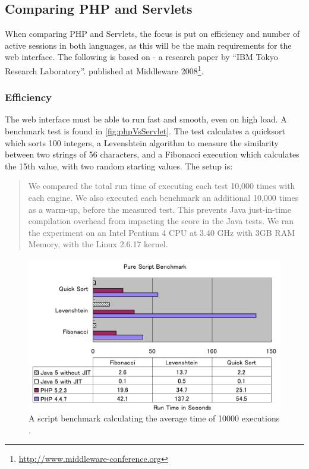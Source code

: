 \subsection*{Comparing PHP and Servlets}
When comparing PHP and Servlets, the focus is put on efficiency and number of active sessions in both languages, as this will be the main requirements for the web interface. The following is based on \cite{servletVsPHP} - a research paper by ``IBM Tokyo Research Laboratory''. published at Middleware 2008\footnote{\url{http://www.middleware-conference.org}}.

\subsubsection*{Efficiency}
The web interface must be able to run fast and smooth, even on high load. A benchmark test is found in \autoref{fig:phpVsServlet}. The test calculates a quicksort which sorts 100 integers, a Levenshtein algorithm to measure the similarity between two strings of 56
characters, and a Fibonacci execution which calculates the 15th value, with two random starting values. The setup is:

\begin{quotation}
We compared the total run time of
executing each test 10,000 times with each engine. We also executed each benchmark
an additional 10,000 times as a warm-up, before the measured test. This prevents
Java just-in-time compilation overhead from impacting the score in the Java tests.
We ran the experiment on an Intel Pentium 4 CPU at 3.40 GHz with 3GB RAM
Memory, with the Linux 2.6.17 kernel. \cite[p. 167]{servletVsPHP}
\end{quotation}

\begin{figure}[htbp]
	\centering
		\includegraphics[width=1.00\textwidth]{images/phpVsServlet.png}
	\caption{A script benchmark calculating the average time of 10000 executions \cite{servletVsPHP}.}
	\label{fig:phpVsServlet}
\end{figure}

